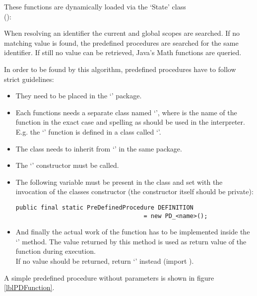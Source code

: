 These functions are dynamically loaded via the `State' class\\ ():

When resolving an identifier the current and global scopes are searched. If no matching value is found, the predefined procedures are searched for the same identifier. If still no value can be retrieved, Java's Math functions are queried.

In order to be found by this algorithm, predefined procedures have to follow strict guidelines:

\begin{itemize}
	\item They need to be placed in the `' package.
	\item Each functions needs a separate class named `', where  is the name of the function in the exact case and spelling as should be used in the interpreter.\\
		E.g. the `' function is defined in a class called `'.
	\item The class needs to inherit from `' in the same package.
	\item The `' constructor must be called.
	\item The following variable must be present in the class and set with the invocation of the classes constructor (the constructor itself should be private):
\begin{lstlisting}[frame=none,numbers=none]
public final static PreDefinedProcedure DEFINITION
                                    = new PD_<name>();
\end{lstlisting}
	\item And finally the actual work of the function has to be implemented inside the `' method. The value returned by this method is used as return value of the function during execution.\\
	If no value should be returned, return `' instead (import ).

\end{itemize}

A simple predefined procedure without parameters is shown in figure \ref{lblPDFunction}.


